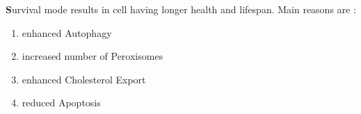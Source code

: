 \textbf Survival mode results in cell having longer health and lifespan. Main reasons are :
\begin{enumerate}
\item enhanced Autophagy
\item increased number of Peroxisomes 
\item enhanced Cholesterol Export
\item reduced Apoptosis
\end{enumerate}
